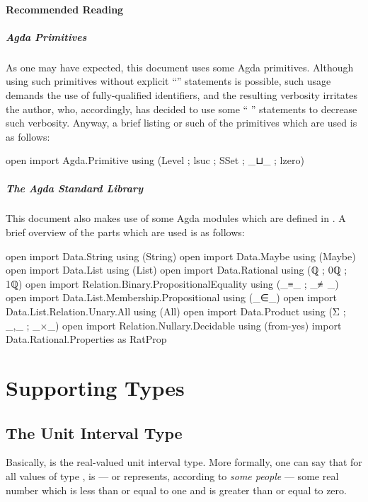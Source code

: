 \documentclass{article}
\theoremstyle{remark}
\begin{document}
\paragraph{Recommended Reading}

\subparagraph{Agda Primitives}
As one may have expected, this document uses some Agda primitives.  Although using such primitives without explicit ``'' statements is possible, such usage demands the use of fully-qualified identifiers, and the resulting verbosity irritates the author, who, accordingly, has decided to use some `` '' statements to decrease such verbosity.  Anyway, a brief listing or such of the primitives which are used is as follows:

\begin{code}
open import Agda.Primitive using (Level ; lsuc ; SSet ; _⊔_ ; lzero)
\end{code}

\subparagraph{The Agda Standard Library}
This document also makes use of some Agda modules which are defined in \textcite{agdaStdlib}.  A brief overview of the parts which are used is as follows:

\begin{code}
open import Data.String using (String)
open import Data.Maybe using (Maybe)
open import Data.List using (List)
open import Data.Rational using (ℚ ; 0ℚ ; 1ℚ)
open import Relation.Binary.PropositionalEquality using (_≡_ ; _≢_)
open import Data.List.Membership.Propositional using (_∈_)
open import Data.List.Relation.Unary.All using (All)
open import Data.Product using (Σ ; _,_ ; _×_)
open import Relation.Nullary.Decidable using (from-yes)
import Data.Rational.Properties as RatProp
\end{code}

\section{Supporting Types}

\subsection{The Unit Interval Type}
Basically,  is the real-valued unit interval type.  More formally, one can say that for all values  of type ,  is --- or represents, according to \emph{some people} --- some real number which is less than or equal to one and is greater than or equal to zero.
\end{document}
